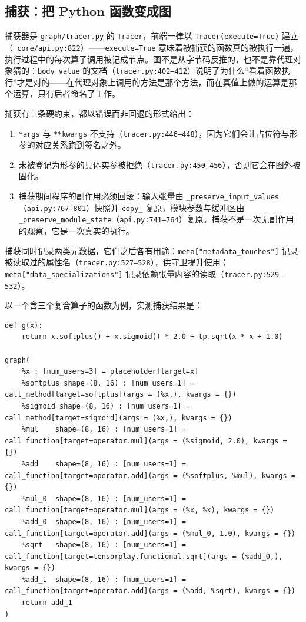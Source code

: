 \subsection{捕获：把 Python 函数变成图}

捕获器是 \texttt{graph/tracer.py} 的 \texttt{Tracer}，前端一律以 \texttt{Tracer(execute=True)} 建立（\texttt{\_core/api.py:822}）——\texttt{execute=True} 意味着被捕获的函数真的被执行一遍，执行过程中的每次算子调用被记成节点。图不是从字节码反推的，也不是靠代理对象猜的：\texttt{body\_value} 的文档（\texttt{tracer.py:402--412}）说明了为什么“看着函数执行”才是对的——在代理对象上调用的方法是那个方法，而在真值上做的运算是那个运算，只有后者命名了工作。

捕获有三条硬约束，都以错误而非回退的形式给出：

\begin{enumerate}[nosep, leftmargin=1.2em]
\item \texttt{*args} 与 \texttt{**kwargs} 不支持（\texttt{tracer.py:446--448}），因为它们会让占位符与形参的对应关系跑到签名之外。
\item 未被登记为形参的具体实参被拒绝（\texttt{tracer.py:450--456}），否则它会在图外被固化。
\item 捕获期间程序的副作用必须回滚：输入张量由 \texttt{\_preserve\_input\_values}（\texttt{api.py:767--801}）快照并 \texttt{copy\_} 复原，模块参数与缓冲区由 \texttt{\_preserve\_module\_state}（\texttt{api.py:741--764}）复原。捕获不是一次无副作用的观察，它是一次真实的执行。
\end{enumerate}

捕获同时记录两类元数据，它们之后各有用途：\texttt{meta["metadata\_touches"]} 记录被读取过的属性名（\texttt{tracer.py:527--528}），供守卫提升使用；\texttt{meta["data\_specializations"]} 记录依赖张量内容的读取（\texttt{tracer.py:529--532}）。

以一个含三个复合算子的函数为例，实测捕获结果是：

\begin{lstlisting}[caption={捕获结果（实测 \texttt{graph} 文本）。占位符名即形参名，元数据写在节点上。}, label=lst:fe:captured, style=pystyle]
def g(x):
    return x.softplus() + x.sigmoid() * 2.0 + tp.sqrt(x * x + 1.0)

graph(
    %x : [num_users=3] = placeholder[target=x]
    %softplus shape=(8, 16) : [num_users=1] = call_method[target=softplus](args = (%x,), kwargs = {})
    %sigmoid shape=(8, 16) : [num_users=1] = call_method[target=sigmoid](args = (%x,), kwargs = {})
    %mul    shape=(8, 16) : [num_users=1] = call_function[target=operator.mul](args = (%sigmoid, 2.0), kwargs = {})
    %add    shape=(8, 16) : [num_users=1] = call_function[target=operator.add](args = (%softplus, %mul), kwargs = {})
    %mul_0  shape=(8, 16) : [num_users=1] = call_function[target=operator.mul](args = (%x, %x), kwargs = {})
    %add_0  shape=(8, 16) : [num_users=1] = call_function[target=operator.add](args = (%mul_0, 1.0), kwargs = {})
    %sqrt   shape=(8, 16) : [num_users=1] = call_function[target=tensorplay.functional.sqrt](args = (%add_0,), kwargs = {})
    %add_1  shape=(8, 16) : [num_users=1] = call_function[target=operator.add](args = (%add, %sqrt), kwargs = {})
    return add_1
)
\end{lstlisting}

